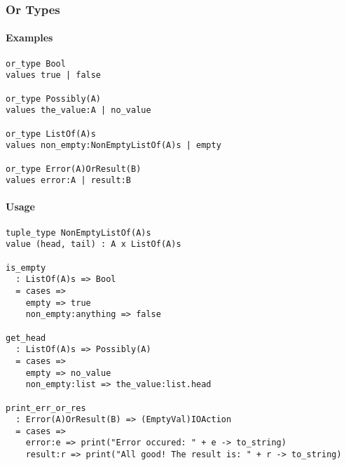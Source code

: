 \documentclass{article}
\begin{document}
\subsubsection{Or Types}
\label{subsubsec:ortypes}

\paragraph{Examples}

\begin{verbatim}
or_type Bool
values true | false

or_type Possibly(A)
values the_value:A | no_value

or_type ListOf(A)s
values non_empty:NonEmptyListOf(A)s | empty

or_type Error(A)OrResult(B)
values error:A | result:B
\end{verbatim}

\paragraph{Usage}

\begin{verbatim}
tuple_type NonEmptyListOf(A)s
value (head, tail) : A x ListOf(A)s

is_empty
  : ListOf(A)s => Bool
  = cases => 
    empty => true
    non_empty:anything => false

get_head
  : ListOf(A)s => Possibly(A)
  = cases => 
    empty => no_value
    non_empty:list => the_value:list.head

print_err_or_res
  : Error(A)OrResult(B) => (EmptyVal)IOAction
  = cases => 
    error:e => print("Error occured: " + e -> to_string)
    result:r => print("All good! The result is: " + r -> to_string)
\end{verbatim}
\end{document}
